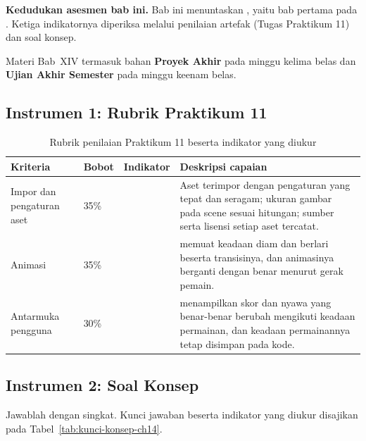 \label{sec:asesmen-aset}

\begin{asesmenbox}
\textbf{Kedudukan asesmen bab ini.} Bab ini menuntaskan , yaitu
bab pertama pada . Ketiga indikatornya diperiksa melalui penilaian
artefak  (Tugas Praktikum 11) dan soal konsep.

\vspace{0.4em}
Materi Bab~XIV termasuk bahan \textbf{Proyek Akhir} pada minggu kelima belas
dan \textbf{Ujian Akhir Semester} pada minggu keenam belas.
\end{asesmenbox}

\subsection*{Instrumen 1: Rubrik Praktikum 11}

\begin{table}[htbp]
\centering
\caption{Rubrik penilaian Praktikum 11 beserta indikator yang diukur}
\label{tab:rubrik-praktikum-11}
{\setlength{\tabcolsep}{4pt}\footnotesize%
\begin{tabularx}{\textwidth}{@{}L{3.2cm} C{1.3cm} C{2.1cm} Y@{}}
\toprule
\headrow \textbf{Kriteria} & \textbf{Bobot} & \textbf{Indikator} & \textbf{Deskripsi capaian} \\
\midrule
Impor dan pengaturan aset & 35\% &  &
Aset terimpor dengan pengaturan yang tepat dan seragam; ukuran gambar pada
scene sesuai hitungan; sumber serta lisensi setiap aset tercatat. \\
\addlinespace
Animasi & 35\% &  &
 memuat keadaan diam dan berlari beserta transisinya, dan
animasinya berganti dengan benar menurut gerak pemain. \\
\addlinespace
Antarmuka pengguna & 30\% &  &
 menampilkan skor dan nyawa yang benar-benar berubah mengikuti
keadaan permainan, dan keadaan permainannya tetap disimpan pada kode. \\
\bottomrule
\end{tabularx}}
\end{table}

\subsection*{Instrumen 2: Soal Konsep}

Jawablah dengan singkat. Kunci jawaban beserta indikator yang diukur disajikan
pada Tabel~\ref{tab:kunci-konsep-ch14}.

